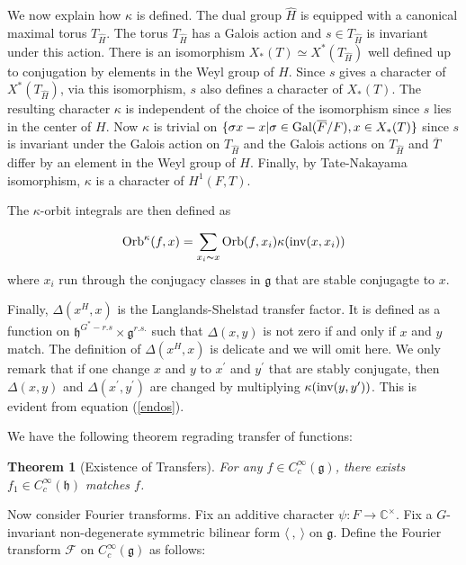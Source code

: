 \documentclass[11pt, oneside,reqno]{amsart}   	%
\newtheorem{theorem}{Theorem}[section]
\begin{document}
We now explain how $\kappa$ is defined. The dual group $\widehat{H}$ is equipped with a canonical maximal torus $T_{\widehat{H}}$. The torus $T_{\widehat{H}}$ has a Galois action and $s \in T_{\widehat{H}}$ is invariant under this action. There is an isomorphism $X_*(T) \simeq X^*(T_{\widehat{H}})$ well defined up to conjugation by elements in the Weyl group of $H$. Since $s$ gives a character of $X^*(T_{\widehat{H}})$, via this isomorphism, $s$ also defines a character of $X_*(T)$. The resulting character $\kappa$ is independent of the choice of the isomorphism since $s$ lies in the center of $H$. Now $\kappa$ is trivial on $\{\sigma x-x| \sigma \in \textup{Gal}(\overline{F}/F), x \in X_*(T)\}$ since $s$ is invariant under the Galois action on $T_{\widehat{H}}$ and the Galois actions on $T_{\widehat{H}}$ and $\overline{T}$ differ by an element in the Weyl group of $H$. Finally, by Tate-Nakayama isomorphism, $\kappa$ is a character of $H^1(F,T)$.

The $\kappa$-orbit integrals are then defined as

$$\textup{Orb}^\kappa(f,x)=\sum_{x_i \thicksim x}\textup{Orb}(f,x_i)\kappa(\textup{inv}(x,x_i))$$
where $x_i$ run through the conjugacy classes in $\mathfrak{g}$ that are stable conjugagte to $x$.

Finally, $\Delta(x^H,x)$ is the Langlands-Shelstad transfer factor. It is defined as a function on $\mathfrak{h}^{G^*-r.s} \times \mathfrak{g}^{r.s.}$ such that $\Delta(x,y)$ is not zero if and only if $x$ and $y$ match. The definition of $\Delta(x^H,x)$ is delicate and we will omit here. We only remark that if one change $x$ and $y$ to $x^\prime$ and $y^\prime$ that are stably conjugate, then $\Delta(x,y)$ and $\Delta(x^\prime,y^\prime)$ are changed by multiplying $\kappa(\textup{inv}(y, y^\prime))$. This is evident from equation (\ref{endos}).

We have the following theorem regrading transfer of functions:

\begin{theorem}[Existence of Transfers] \label{LS exist}
For any $f \in C_c^\infty(\mathfrak{g})$, there exists $f_1 \in C_c^\infty(\mathfrak{h})$ matches $f$.
\end{theorem}

Now consider Fourier transforms. Fix an additive character $\psi: F \rightarrow \mathbb{C}^\times$. Fix a $G$-invariant non-degenerate symmetric bilinear form $\langle \ , \ \rangle$ on $\mathfrak{g}$. Define the Fourier transform $\mathcal{F}$ on $C_c^\infty(\mathfrak{g})$ as follows:
\end{document}
